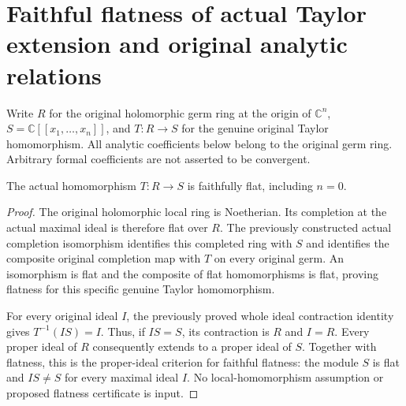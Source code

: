 \section{Faithful flatness of actual Taylor extension and original analytic relations}

Write $R$ for the original holomorphic germ ring at the origin of
$\mathbb C^n$, $S=\mathbb C[[x_1,\ldots,x_n]]$, and $T:R\to S$ for
the genuine original Taylor homomorphism. All analytic coefficients below
belong to the original germ ring. Arbitrary formal coefficients are not
asserted to be convergent.

\begin{theorem}
\label{hir:actual-original-taylor-faithfully-flat}
\leanok
The actual homomorphism $T:R\to S$ is faithfully flat, including $n=0$.
\end{theorem}
\begin{proof}
The original holomorphic local ring is Noetherian. Its completion at the
actual maximal ideal is therefore flat over $R$. The previously constructed
actual completion isomorphism identifies this completed ring with $S$ and
identifies the composite original completion map with $T$ on every original
germ. An isomorphism is flat and the composite of flat homomorphisms is
flat, proving flatness for this specific genuine Taylor homomorphism.

For every original ideal $I$, the previously proved whole ideal contraction
identity gives $T^{-1}(IS)=I$. Thus, if $IS=S$, its contraction is $R$ and
$I=R$. Every proper ideal of $R$ consequently extends to a proper ideal of
$S$. Together with flatness, this is the proper-ideal criterion for faithful
flatness: the module $S$ is flat and $IS\ne S$ for every maximal ideal $I$.
No local-homomorphism assumption or proposed flatness certificate is input.
\end{proof}

